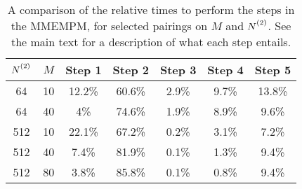 \begin{table}
    \begin{center}
        \begin{tabular}{ c c c c c c c }
            \toprule
            $\Ntwo$ &
            $M$ &
            Step 1 &
            Step 2 &
            Step 3 &
            Step 4 &
            Step 5 \\
            \midrule
            64 & 10 & 12.2\% & 60.6\% & 2.9\% & 9.7\% & 13.8\% \\
            64 & 40 & 4\% & 74.6\% & 1.9\% & 8.9\% & 9.6\% \\
            512 & 10 & 22.1\% & 67.2\% & 0.2\% & 3.1\% & 7.2\% \\
            512 & 40 & 7.4\% & 81.9\% & 0.1\% & 1.3\% & 9.4\% \\
            512 & 80 & 3.8\% & 85.8\% & 0.1\% & 0.8\% & 9.4\% \\
            \bottomrule
        \end{tabular}
    \end{center}
    \caption[
        A comparison of the relative times to perform the steps in the \acs{MMEMPM}.
    ]{
        A comparison of the relative times to perform the steps in the
        \acs{MMEMPM}, for selected pairings on $M$ and $\Ntwo$. See the main
        text for a description of what each step entails.
    }
    \label{tab:mmempm-steps}
\end{table}

